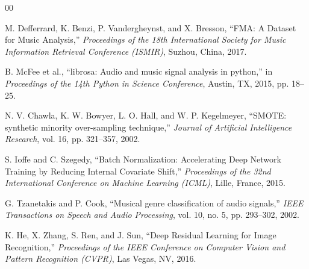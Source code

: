 \documentclass[conference]{IEEEtran}
\begin{document}
\begin{thebibliography}{00}

 M. Defferrard, K. Benzi, P. Vandergheynst, and X. Bresson, ``FMA: A Dataset for Music Analysis,'' \textit{Proceedings of the 18th International Society for Music Information Retrieval Conference (ISMIR)}, Suzhou, China, 2017.

 B. McFee et al., ``librosa: Audio and music signal analysis in python,'' in \textit{Proceedings of the 14th Python in Science Conference}, Austin, TX, 2015, pp. 18--25.

 N. V. Chawla, K. W. Bowyer, L. O. Hall, and W. P. Kegelmeyer, ``SMOTE: synthetic minority over-sampling technique,'' \textit{Journal of Artificial Intelligence Research}, vol. 16, pp. 321--357, 2002.

 S. Ioffe and C. Szegedy, ``Batch Normalization: Accelerating Deep Network Training by Reducing Internal Covariate Shift,'' \textit{Proceedings of the 32nd International Conference on Machine Learning (ICML)}, Lille, France, 2015.

 G. Tzanetakis and P. Cook, ``Musical genre classification of audio signals,'' \textit{IEEE Transactions on Speech and Audio Processing}, vol. 10, no. 5, pp. 293--302, 2002.

 K. He, X. Zhang, S. Ren, and J. Sun, ``Deep Residual Learning for Image Recognition,'' \textit{Proceedings of the IEEE Conference on Computer Vision and Pattern Recognition (CVPR)}, Las Vegas, NV, 2016.

\end{thebibliography}
\end{document}

